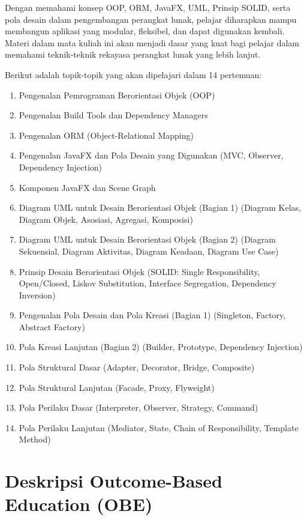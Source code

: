 Dengan memahami konsep OOP, ORM, JavaFX, UML, Prinsip SOLID, serta pola desain dalam pengembangan perangkat lunak, pelajar diharapkan mampu membangun aplikasi yang modular, fleksibel, dan dapat digunakan kembali. Materi dalam mata kuliah ini akan menjadi dasar yang kuat bagi pelajar dalam memahami teknik-teknik rekayasa perangkat lunak yang lebih lanjut. 

Berikut adalah topik-topik yang akan dipelajari dalam 14 pertemuan:

\begin{enumerate}
	\item Pengenalan Pemrograman Berorientasi Objek (OOP)
	\item Pengenalan Build Tools dan Dependency Managers
	\item Pengenalan ORM (Object-Relational Mapping)
	\item Pengenalan JavaFX dan Pola Desain yang Digunakan (MVC, Observer, Dependency Injection)
	\item Komponen JavaFX dan Scene Graph
	\item Diagram UML untuk Desain Berorientasi Objek (Bagian 1) (Diagram Kelas, Diagram Objek, Asosiasi, Agregasi, Komposisi)
	\item Diagram UML untuk Desain Berorientasi Objek (Bagian 2) (Diagram Sekuensial, Diagram Aktivitas, Diagram Keadaan, Diagram Use Case)
	\item Prinsip Desain Berorientasi Objek (SOLID: Single Responsibility, Open/Closed, Liskov Substitution, Interface Segregation, Dependency Inversion)
	\item Pengenalan Pola Desain dan Pola Kreasi (Bagian 1) (Singleton, Factory, Abstract Factory)
	\item Pola Kreasi Lanjutan (Bagian 2) (Builder, Prototype, Dependency Injection)
	\item Pola Struktural Dasar (Adapter, Decorator, Bridge, Composite)
	\item Pola Struktural Lanjutan (Facade, Proxy, Flyweight)
	\item Pola Perilaku Dasar (Interpreter, Observer, Strategy, Command)
	\item Pola Perilaku Lanjutan (Mediator, State, Chain of Responsibility, Template Method)
\end{enumerate}


\section{Deskripsi Outcome-Based Education (OBE)}

